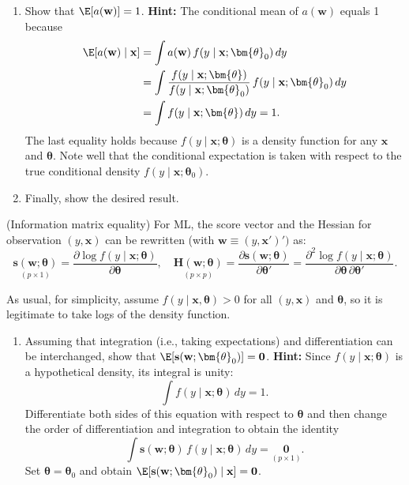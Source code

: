 \begin{problemset}
\begin{enumerate}[label=(\alph*)]
\item Show that $\E[a(\mathbf{w})] = 1$. \textbf{Hint:} The conditional mean of $a(\mathbf{w})$ equals 1 because
\begin{align*}
\E[a(\mathbf{w}) \mid \mathbf{x}] &= \int a(\mathbf{w})\,f(y \mid \mathbf{x}; \bm{\theta}_0)\,dy \\
&= \int \frac{f(y \mid \mathbf{x}; \bm{\theta})}{f(y \mid \mathbf{x}; \bm{\theta}_0)}\,f(y \mid \mathbf{x}; \bm{\theta}_0)\,dy \\
&= \int f(y \mid \mathbf{x}; \bm{\theta})\,dy = 1.
\end{align*}
The last equality holds because $f(y \mid \mathbf{x}; \bm{\theta})$ is a density function for any $\mathbf{x}$ and $\bm{\theta}$. Note well that the conditional expectation is taken with respect to the true conditional density $f(y \mid \mathbf{x}; \bm{\theta}_0)$.

\item Finally, show the desired result.
\end{enumerate}

\exercise[2] (Information matrix equality) \enspace For ML, the score vector and the Hessian for observation $(y, \mathbf{x})$ can be rewritten (with $\mathbf{w} \equiv (y, \mathbf{x}')')$ as:
\[
\underset{(p \times 1)}{\mathbf{s}(\mathbf{w}; \bm{\theta})} = \frac{\partial\log f(y \mid \mathbf{x}; \bm{\theta})}{\partial\bm{\theta}}, \quad \underset{(p \times p)}{\mathbf{H}(\mathbf{w}; \bm{\theta})} = \frac{\partial\mathbf{s}(\mathbf{w}; \bm{\theta})}{\partial\bm{\theta}'} = \frac{\partial^2\log f(y \mid \mathbf{x}; \bm{\theta})}{\partial\bm{\theta}\,\partial\bm{\theta}'}.
\]

As usual, for simplicity, assume $f(y \mid \mathbf{x}, \bm{\theta}) > 0$ for all $(y, \mathbf{x})$ and $\bm{\theta}$, so it is legitimate to take logs of the density function.

\begin{enumerate}[label=(\alph*)]
\item Assuming that integration (i.e., taking expectations) and differentiation can be interchanged, show that $\E[\mathbf{s}(\mathbf{w}; \bm{\theta}_0)] = \mathbf{0}$. \textbf{Hint:} Since $f(y \mid \mathbf{x}; \bm{\theta})$ is a hypothetical density, its integral is unity:
\[
\int f(y \mid \mathbf{x}; \bm{\theta})\,dy = 1.
\]
Differentiate both sides of this equation with respect to $\bm{\theta}$ and then change the order of differentiation and integration to obtain the identity
\[
\int \mathbf{s}(\mathbf{w}; \bm{\theta})\,f(y \mid \mathbf{x}; \bm{\theta})\,dy = \underset{(p \times 1)}{\mathbf{0}}.
\]
Set $\bm{\theta} = \bm{\theta}_0$ and obtain $\E[\mathbf{s}(\mathbf{w}; \bm{\theta}_0) \mid \mathbf{x}] = \mathbf{0}$.


\end{enumerate}
\end{problemset}

